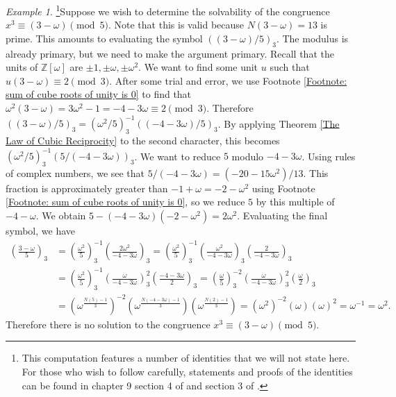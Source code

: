 \documentclass[10pt]{amsart}
\newcommand{\ZZ}{\mathbb{Z}}
\theoremstyle{plain}
\theoremstyle{definition}
\theoremstyle{remark}
\newtheorem{ex}{Example}
\numberwithin{equation}{section}
\begin{document}
\begin{ex}
    \footnote{This computation features a number of identities that we will not state here. For those who wish to follow carefully, statements and proofs of the identities can be found in chapter 9 section 4 of \cite{ireland1990classical} and section 3 of \cite{relyea2024finitefieldshigherreciprocity}.}Suppose we wish to determine the solvability of the congruence $x^{3}\equiv (3-\omega)\pmod{5}$. Note that this is valid because $N(3-\omega) = 13$ is prime. This amounts to evaluating the symbol $((3-\omega)/5)_{3}$. The modulus is already primary, but we need to make the argument primary. Recall that the units of $\ZZ[\omega]$ are $\pm 1,\pm\omega,\pm\omega^{2}$. We want to find some unit $u$ such that $u(3-\omega)\equiv 2\pmod{3}$. After some trial and error, we use Footnote \ref{Footnote: sum of cube roots of unity is 0} to find that $\omega^{2}(3-\omega) = 3\omega^{2}-1 = -4-3\omega \equiv 2\pmod{3}$. Therefore $((3-\omega)/5)_{3} = (\omega^{2}/5)^{-1}_{3}((-4-3\omega)/5)_{3}$. By applying Theorem \ref{The Law of Cubic Reciprocity} to the second character, this becomes $(\omega^{2}/5)^{-1}_{3}(5/(-4-3\omega))_{3}$. We want to reduce $5$ modulo $-4-3\omega$. Using rules of complex numbers, we see that $5/(-4-3\omega) = (-20-15\omega^{2})/13$. This fraction is approximately greater than $-1+\omega=-2-\omega^{2}$ using Footnote \ref{Footnote: sum of cube roots of unity is 0}, so we reduce $5$ by this multiple of $-4-\omega$. We obtain $5-(-4-3\omega)(-2-\omega^{2}) = 2\omega^{2}$. Evaluating the final symbol, we have
    \begin{align*}
        \left( \frac{3-\omega}{5}  \right)_{3} & = \left( \frac{\omega^{2}}{5}  \right)_{3}^{-1}\left( \frac{2\omega^{2}}{-4-3\omega} \right)_{3} = \left( \frac{\omega^{2}}{5} \right)_{3}^{-1}\left( \frac{\omega^{2}}{-4-3\omega}   \right)_{3}\left( \frac{2}{-4-3\omega} \right)_{3} 
        \\
        & = \left( \frac{\omega^{2}}{5} \right)_{3}^{-1}\left( \frac{\omega}{-4-3\omega}   \right)_{3}^{2}\left( \frac{-4-3\omega}{2} \right)_{3} = \left( \frac{\omega}{5} \right)_{3}^{-2}\left( \frac{\omega}{-4-3\omega} \right)_{3}^{2}\left( \frac{\omega}{2} \right)_{3} 
        \\
        & = (\omega^{\frac{N(5)-1}{3}})^{-2}(\omega^{\frac{N(-4-3\omega)-1}{3}})(\omega^{\frac{N(2)-1}{3}}) = (\omega^{2})^{-2}(\omega)(\omega)^{2} = \omega^{-1} = \omega^{2}.
    \end{align*}
    Therefore there is no solution to the congruence $x^{3}\equiv (3-\omega)\pmod{5}$. 
\end{ex}
\end{document}
